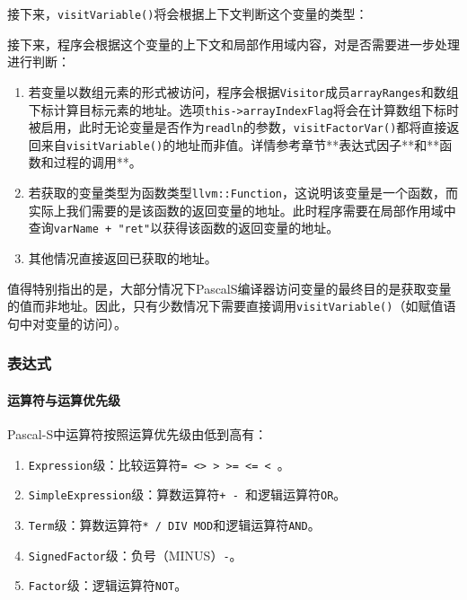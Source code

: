 \documentclass[lang=cn,11pt,a4paper,cite=authornum]{paper}
\begin{document}
接下来，\texttt{visitVariable()}将会根据上下文判断这个变量的类型：

接下来，程序会根据这个变量的上下文和局部作用域内容，对是否需要进一步处理进行判断：

\begin{enumerate}
    \item 若变量以数组元素的形式被访问，程序会根据\texttt{Visitor}成员\texttt{arrayRanges}和数组下标计算目标元素的地址。选项\texttt{this->arrayIndexFlag}将会在计算数组下标时被启用，此时无论变量是否作为\texttt{readln}的参数，\texttt{visitFactorVar()}都将直接返回来自\texttt{visitVariable()}的地址而非值。详情参考章节**表达式因子**和**函数和过程的调用**。
    \item 若获取的变量类型为函数类型\texttt{llvm::Function}，这说明该变量是一个函数，而实际上我们需要的是该函数的返回变量的地址。此时程序需要在局部作用域中查询\texttt{varName + "ret"}以获得该函数的返回变量的地址。
    \item 其他情况直接返回已获取的地址。
\end{enumerate}

值得特别指出的是，大部分情况下PascalS编译器访问变量的最终目的是获取变量的值而非地址。因此，只有少数情况下需要直接调用\texttt{visitVariable()}（如赋值语句中对变量的访问）。

\subsubsection{表达式}

\paragraph{运算符与运算优先级}

Pascal-S中运算符按照运算优先级由低到高有：

\begin{enumerate}
    \item \texttt{Expression}级：比较运算符\texttt{= <> > >= <= < }。
    \item \texttt{SimpleExpression}级：算数运算符\texttt{+ - }和逻辑运算符\texttt{OR}。
    \item \texttt{Term}级：算数运算符\texttt{* / DIV MOD}和逻辑运算符\texttt{AND}。
    \item \texttt{SignedFactor}级：负号（MINUS）\texttt{-}。
    \item \texttt{Factor}级：逻辑运算符\texttt{NOT}。
\end{enumerate}
\end{document}
